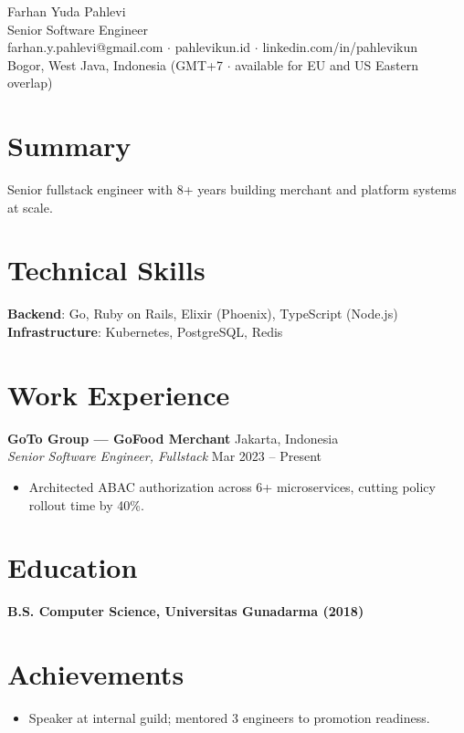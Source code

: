 \documentclass[11pt]{article}
\begin{document}
{\LARGE Farhan Yuda Pahlevi}\\
{\large Senior Software Engineer}\\
farhan.y.pahlevi@gmail.com $\cdot$ pahlevikun.id $\cdot$ linkedin.com/in/pahlevikun\\
Bogor, West Java, Indonesia (GMT+7 $\cdot$ available for EU and US Eastern overlap)\\

\section*{Summary}
Senior fullstack engineer with 8+ years building merchant and platform systems at scale.

\section*{Technical Skills}
\textbf{Backend}: Go, Ruby on Rails, Elixir (Phoenix), TypeScript (Node.js)\\
\textbf{Infrastructure}: Kubernetes, PostgreSQL, Redis\\

\section*{Work Experience}
\textbf{GoTo Group — GoFood Merchant} \hfill Jakarta, Indonesia\\
\textit{Senior Software Engineer, Fullstack} \hfill Mar 2023 -- Present\\
\begin{itemize}
\item Architected ABAC authorization across 6+ microservices, cutting policy rollout time by 40\%.
\end{itemize}

\section*{Education}
\textbf{B.S. Computer Science, Universitas Gunadarma (2018)}\\

\section*{Achievements}
\begin{itemize}
\item Speaker at internal guild; mentored 3 engineers to promotion readiness.
\end{itemize}
\end{document}
